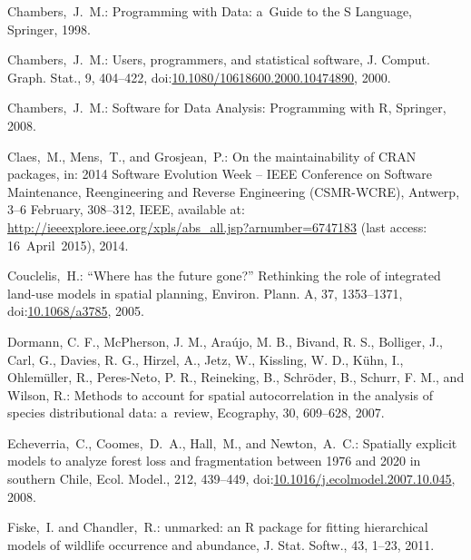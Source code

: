 \documentclass[gmdd, online, hvmath]{copernicus}
\begin{document}
\begin{thebibliography}{97}
 Chambers,~J.~M.: Programming
  with Data: a~Guide to the S Language, Springer,
  1998.


 Chambers,~J.~M.: Users,
  programmers, and statistical software, J. Comput. Graph. Stat., 9,
  404--422,
doi:\href{http://dx.doi.org/10.1080/10618600.2000.10474890}{10.1080/10618600.2000.10474890}, 2000. %


 Chambers,~J.~M.: Software for
  Data Analysis: Programming with R, Springer, 2008.


  Claes,~M., Mens,~T., and Grosjean,~P.: On the maintainability of
  {CRAN} packages, in: 2014 Software Evolution Week -- IEEE Conference
  on Software Maintenance, Reengineering and Reverse Engineering
  (CSMR-WCRE), Antwerp, 3--6 February, 308--312, {IEEE}, available at:
  \url{http://ieeexplore.ieee.org/xpls/abs_all.jsp?arnumber=6747183}
  (last access: 16~April~2015), 2014.


 Couclelis,~H.: ``Where has
  the future gone?'' Rethinking the role of integrated land-use models
  in spatial planning, Environ. Plann. A, 37, 1353--1371,
  doi:\href{http://dx.doi.org/10.1068/a3785}{10.1068/a3785}, 2005. %


    Dormann, C. F., McPherson, J. M., Ara\'ujo, M. B., Bivand, R. S.,
     Bolliger, J., Carl, G., Davies, R. G., Hirzel, A., Jetz, W., Kissling, W. D., K\"uhn,
      I., Ohlem\"uller, R., Peres-Neto, P. R., Reineking, B., Schr\"oder, B., Schurr, F. M., and Wilson,
      R.:
  Methods to account for spatial autocorrelation in the analysis of
  species distributional data: a~review, Ecography, 30, 609--628,
  2007.


 Echeverria,~C., Coomes,~D.~A., Hall,~M.,
  and Newton,~A.~C.: Spatially explicit models to analyze forest loss
  and fragmentation between 1976 and 2020 in southern Chile,
  Ecol. Model., 212, 439--449,
doi:\href{http://dx.doi.org/10.1016/j.ecolmodel.2007.10.045}{10.1016/j.ecolmodel.2007.10.045},
  2008.


 Fiske,~I. and
  Chandler,~R.: unmarked: an R package for fitting hierarchical models
  of wildlife occurrence and abundance, J. Stat. Softw., 43, 1--23,
  2011. %



\end{thebibliography}
\end{document}
